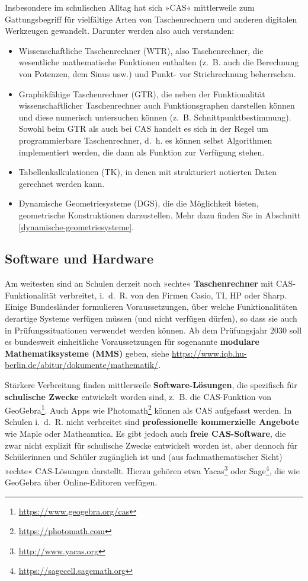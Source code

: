 \documentclass[
]{scrbook}
\providecommand{\tightlist}{%
  \setlength{\itemsep}{0pt}\setlength{\parskip}{0pt}}
\theoremstyle{definition}
\theoremstyle{definition}
\theoremstyle{definition}
\theoremstyle{definition}
\theoremstyle{remark}
\begin{document}
Insbesondere im schulischen Alltag hat sich »CAS« mittlerweile zum Gattungsbegriff für vielfältige Arten von Taschenrechnern und anderen digitalen Werkzeugen gewandelt. Darunter werden also auch verstanden:

\begin{itemize}
\tightlist
\item
  Wissenschaftliche Taschenrechner (WTR), also Taschenrechner, die wesentliche mathematische Funktionen enthalten (z.~B. auch die Berechnung von Potenzen, dem Sinus usw.) und Punkt- vor Strichrechnung beherrschen.
\item
  Graphikfähige Taschenrechner (GTR), die neben der Funktionalität wissenschaftlicher Taschenrechner auch Funktionsgraphen darstellen können und diese numerisch untersuchen können (z.~B. Schnittpunktbestimmung). Sowohl beim GTR als auch bei CAS handelt es sich in der Regel um programmierbare Taschenrechner, d.~h. es können selbst Algorithmen implementiert werden, die dann als Funktion zur Verfügung stehen.
\item
  Tabellenkalkulationen (TK), in denen mit strukturiert notierten Daten gerechnet werden kann.
\item
  Dynamische Geometriesysteme (DGS), die die Möglichkeit bieten, geometrische Konstruktionen darzustellen. Mehr dazu finden Sie in Abschnitt \ref{dynamische-geometriesysteme}.
\end{itemize}

\subsection{Software und Hardware}\label{software-und-hardware}

Am weitesten sind an Schulen derzeit noch »echte« \textbf{Taschenrechner} mit CAS-Funktionalität verbreitet, i.~d.~R. von den Firmen Casio, TI, HP oder Sharp. Einige Bundesländer formulieren Voraussetzungen, über welche Funktionalitäten derartige Systeme verfügen müssen (und nicht verfügen dürfen), so dass sie auch in Prüfungssituationen verwendet werden können. Ab dem Prüfungsjahr 2030 soll es bundesweit einheitliche Voraussetzungen für sogenannte \textbf{modulare Mathematiksysteme (MMS)} geben, siehe \url{https://www.iqb.hu-berlin.de/abitur/dokumente/mathematik/}.

Stärkere Verbreitung finden mittlerweile \textbf{Software-Lösungen}, die spezifisch für \textbf{schulische Zwecke} entwickelt worden sind, z.~B. die CAS-Funktion von GeoGebra\footnote{\url{https://www.geogebra.org/cas}}. Auch Apps wie Photomath\footnote{\url{https://photomath.com}} können als CAS aufgefasst werden. In Schulen i.~d.~R. nicht verbreitet sind \textbf{professionelle kommerzielle Angebote} wie Maple oder Matheamtica. Es gibt jedoch auch \textbf{freie CAS-Software}, die zwar nicht explizit für schulische Zwecke entwickelt worden ist, aber dennoch für Schülerinnen und Schüler zugänglich ist und (aus fachmathematischer Sicht) »echte« CAS-Lösungen darstellt. Hierzu gehören etwa Yacas\footnote{\url{http://www.yacas.org}} oder Sage\footnote{\url{https://sagecell.sagemath.org}}, die wie GeoGebra über Online-Editoren verfügen.
\end{document}
